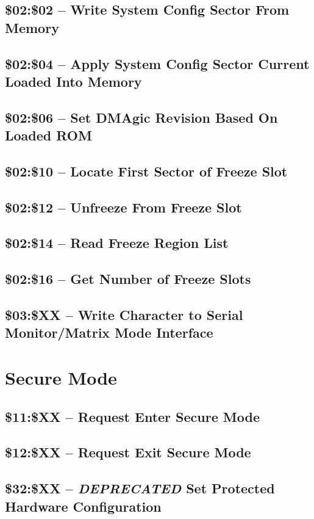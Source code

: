\subsection{\$02:\$02 -- Write System Config Sector From Memory}
\subsection{\$02:\$04 -- Apply System Config Sector Current Loaded Into Memory}
\subsection{\$02:\$06 -- Set DMAgic Revision Based On Loaded ROM}

\subsection{\$02:\$10 -- Locate First Sector of Freeze Slot}
\subsection{\$02:\$12 -- Unfreeze From Freeze Slot}
\subsection{\$02:\$14 -- Read Freeze Region List}
\subsection{\$02:\$16 -- Get Number of Freeze Slots}

\subsection{\$03:\$XX -- Write Character to Serial Monitor/Matrix Mode Interface}

\section{Secure Mode}

\subsection{\$11:\$XX -- Request Enter Secure Mode}
\subsection{\$12:\$XX -- Request Exit Secure Mode}
\subsection{\$32:\$XX -- {\em DEPRECATED} Set Protected Hardware Configuration}

